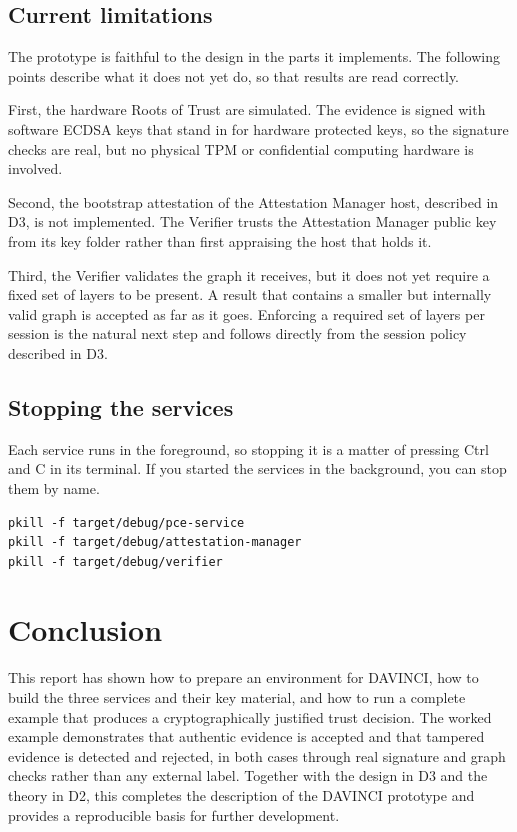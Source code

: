\documentclass[11pt,a4paper]{article}
\begin{document}
\subsection{Current limitations}

The prototype is faithful to the design in the parts it implements. The following
points describe what it does not yet do, so that results are read correctly.

First, the hardware Roots of Trust are simulated. The evidence is signed with
software ECDSA keys that stand in for hardware protected keys, so the signature
checks are real, but no physical TPM or confidential computing hardware is
involved.

Second, the bootstrap attestation of the Attestation Manager host, described in
D3, is not implemented. The Verifier trusts the Attestation Manager public key
from its key folder rather than first appraising the host that holds it.

Third, the Verifier validates the graph it receives, but it does not yet require
a fixed set of layers to be present. A result that contains a smaller but
internally valid graph is accepted as far as it goes. Enforcing a required set of
layers per session is the natural next step and follows directly from the session
policy described in D3.

\subsection{Stopping the services}

Each service runs in the foreground, so stopping it is a matter of pressing Ctrl
and C in its terminal. If you started the services in the background, you can stop
them by name.

\begin{lstlisting}
pkill -f target/debug/pce-service
pkill -f target/debug/attestation-manager
pkill -f target/debug/verifier
\end{lstlisting}

\section{Conclusion}

This report has shown how to prepare an environment for DAVINCI, how to build the
three services and their key material, and how to run a complete example that
produces a cryptographically justified trust decision. The worked example
demonstrates that authentic evidence is accepted and that tampered evidence is
detected and rejected, in both cases through real signature and graph checks
rather than any external label. Together with the design in D3 and the theory in
D2, this completes the description of the DAVINCI prototype and provides a
reproducible basis for further development.
\end{document}
